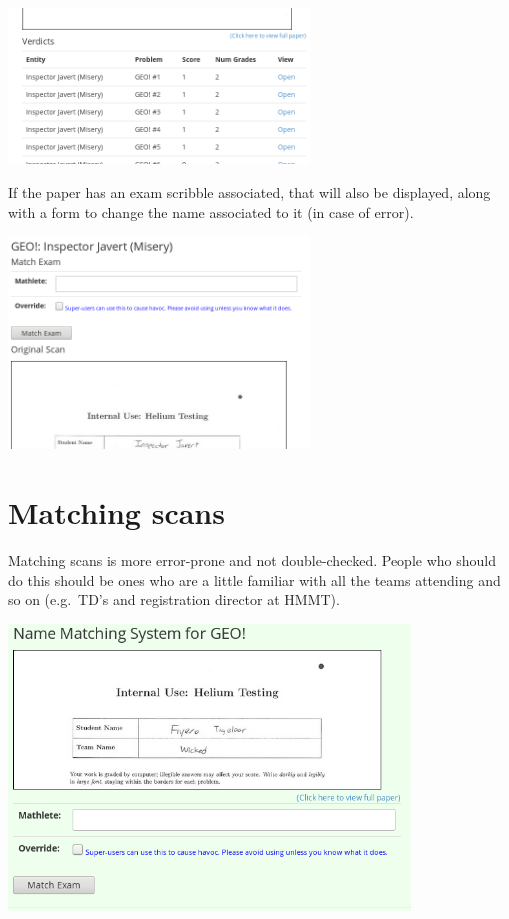 \begin{center}
	\includegraphics[width=0.6\textwidth]{images/viewpaper2.png}
\end{center}

If the paper has an exam scribble associated,
that will also be displayed,
along with a form to change the name associated to it
(in case of error).

\begin{center}
	\includegraphics[width=0.6\textwidth]{images/viewpaper1.png}
\end{center}


\section{Matching scans}
Matching scans is more error-prone and not double-checked.
People who should do this should be ones who are a little familiar with
all the teams attending and so on (e.g.\ TD's and registration director at HMMT).

\begin{center}
	\includegraphics[width=0.8\textwidth]{images/papermatch.png}
\end{center}

